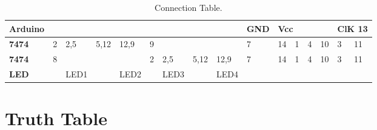 \documentclass[journal,12pt,twocolumn]{IEEEtran}
\begin{document}
\newpage
\begin{table}[h]
\large
\centering

\begin{tabular}{|l|l|l|l|l|l|l|l|l|l|llll|ll|}
\hline
\textbf{Arduino} &   &      &      &      &   &      &      &      & GND & \multicolumn{4}{l|}{Vcc}                                                       & \multicolumn{2}{l|}{ClK  13} \\ \hline
\textbf{7474}    & 2 & 2,5  & 5,12 & 12,9 & 9 &      &      &      & 7   & \multicolumn{1}{l|}{14} & \multicolumn{1}{l|}{1} & \multicolumn{1}{l|}{4} & 10 & \multicolumn{1}{l|}{3}  & 11 \\ \hline
\textbf{7474}    & 8 &      &      &      & 2 & 2,5  & 5,12 & 12,9 & 7   & \multicolumn{1}{l|}{14} & \multicolumn{1}{l|}{1} & \multicolumn{1}{l|}{4} & 10 & \multicolumn{1}{l|}{3}  & 11 \\ \hline
\textbf{LED}     &   & LED1 &      & LED2 &   & LED3 &      & LED4 &     & \multicolumn{1}{l|}{}   & \multicolumn{1}{l|}{}  & \multicolumn{1}{l|}{}  &    & \multicolumn{1}{l|}{}   &    \\ \hline
\end{tabular}

\caption{Connection Table.}
\label{table:1}
\end{table}


\section{Truth Table}
\end{document}
